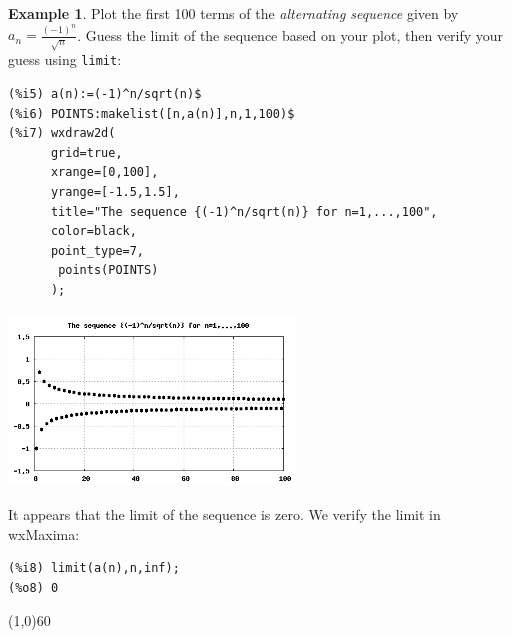 \documentclass[10.5pt,twoside]{report}
\theoremstyle{definition}
\newtheorem{exmp}{Example}[section]
\begin{document}
\begin{exmp} Plot the first 100 terms of the \textit{alternating sequence} given by $a_n=\frac{(-1)^n}{\sqrt{n}}$.  Guess the limit of the sequence based on your plot, then verify your guess using \verb|limit|:\\

\begin{verbatim}
(%i5) a(n):=(-1)^n/sqrt(n)$
(%i6) POINTS:makelist([n,a(n)],n,1,100)$
(%i7) wxdraw2d(
      grid=true,
      xrange=[0,100],
      yrange=[-1.5,1.5],
      title="The sequence {(-1)^n/sqrt(n)} for n=1,...,100",
      color=black,
      point_type=7,
       points(POINTS)
      );
\end{verbatim}

\includegraphics[width=3in]{example_6_1_2_1}

It appears that the limit of the sequence is zero. We verify the limit in wxMaxima:

\begin{verbatim}
(%i8) limit(a(n),n,inf);
(%o8) 0
\end{verbatim}

\end{exmp}

\line(1,0){60}
\linethickness{0.5mm}
\end{document}
